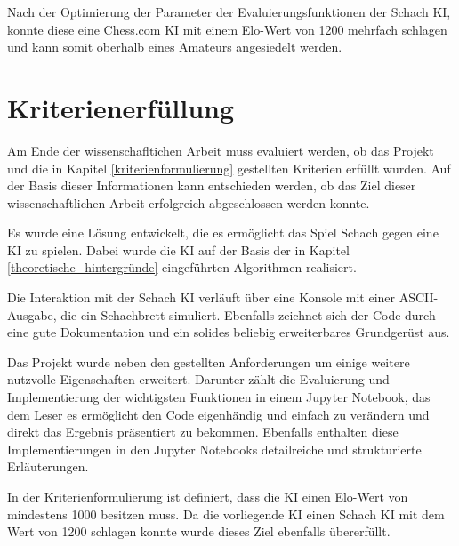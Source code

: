 Nach der Optimierung der Parameter der Evaluierungsfunktionen der Schach KI, konnte diese eine Chess.com KI mit einem Elo-Wert von 1200 mehrfach schlagen und kann somit oberhalb eines Amateurs angesiedelt werden.

\iffalse
wichtigste ist die materialbewertung
boardpos zu hoch  figur bessere pos, aber dafür angreifbar und im nächsten zug tot
start/mid/end pos und material unterschied wichtig
kingzone zu hoch  verlierst mehr figuren
mobility niedrig, wenn alles gleich ist, aber sollte keine andere fkt übertreffen
tiefe
history
attacked pieces geringer als boardvalue, nicht nur einen stein sondern alle zsm sind wichtiger
\fi

\section{Kriterienerfüllung}
Am Ende der wissenschafltichen Arbeit muss evaluiert werden, ob das Projekt und die in Kapitel \ref{kriterienformulierung} gestellten Kriterien erfüllt wurden. Auf der Basis dieser Informationen kann entschieden werden, ob das Ziel dieser wissenschaftlichen Arbeit erfolgreich abgeschlossen werden konnte.

Es wurde eine Lösung entwickelt, die es ermöglicht das Spiel Schach gegen eine KI zu spielen. Dabei wurde die KI auf der Basis der in Kapitel \ref{theoretische_hintergründe} eingeführten Algorithmen realisiert.

Die Interaktion mit der Schach KI verläuft über eine Konsole mit einer ASCII-Ausgabe, die ein Schachbrett simuliert. Ebenfalls zeichnet sich der Code durch eine gute Dokumentation und ein solides beliebig erweiterbares Grundgerüst aus.

Das Projekt wurde neben den gestellten Anforderungen um einige weitere nutzvolle Eigenschaften erweitert. Darunter zählt die Evaluierung und Implementierung der wichtigsten Funktionen in einem Jupyter Notebook, das dem Leser es ermöglicht den Code eigenhändig und einfach zu verändern und direkt das Ergebnis präsentiert zu bekommen. Ebenfalls enthalten diese Implementierungen in den Jupyter Notebooks detailreiche und strukturierte Erläuterungen.

In der Kriterienformulierung ist definiert, dass die KI einen Elo-Wert von mindestens 1000 besitzen muss. Da die vorliegende KI einen Schach KI mit dem Wert von 1200 schlagen konnte wurde dieses Ziel ebenfalls übererfüllt.


